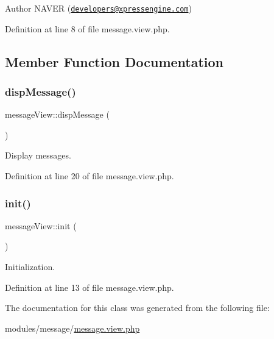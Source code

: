\begin{DoxyAuthor}{Author}
N\+A\+V\+ER (\href{mailto:developers@xpressengine.com}{\tt developers@xpressengine.\+com}) 
\end{DoxyAuthor}


Definition at line 8 of file message.\+view.\+php.



\subsection{Member Function Documentation}
\mbox{\label{classmessageView_aba0cda32f7981221f5a05f2bc8edb302}} 
\subsubsection{\texorpdfstring{disp\+Message()}{dispMessage()}}
{\footnotesize\ttfamily message\+View\+::disp\+Message (\begin{DoxyParamCaption}{ }\end{DoxyParamCaption})}



Display messages. 



Definition at line 20 of file message.\+view.\+php.

\mbox{\label{classmessageView_a247eb797a3d57ab05fc99d629014989a}} 
\subsubsection{\texorpdfstring{init()}{init()}}
{\footnotesize\ttfamily message\+View\+::init (\begin{DoxyParamCaption}{ }\end{DoxyParamCaption})}



Initialization. 



Definition at line 13 of file message.\+view.\+php.



The documentation for this class was generated from the following file\+:\begin{DoxyCompactItemize}
\item 
modules/message/\hyperlink{message_8view_8php}{message.\+view.\+php}\end{DoxyCompactItemize}
